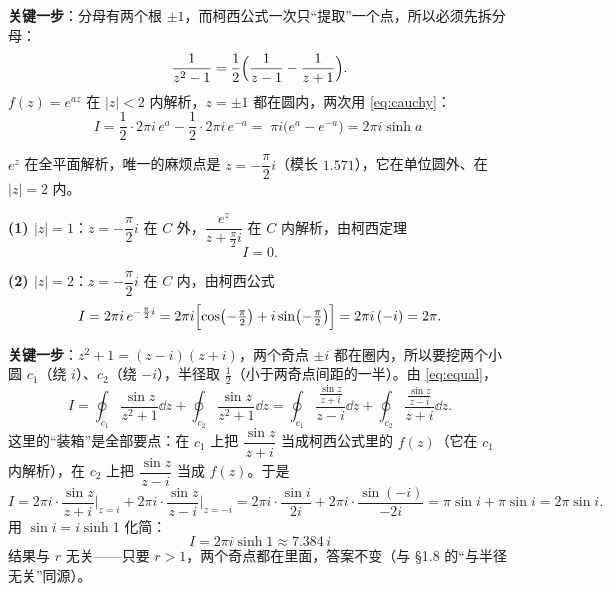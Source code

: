 \documentclass[11pt]{ctexart}
\renewcommand{\qbreak}{\needspace{0.45\textheight}}
\begin{document}
\textbf{关键一步}：分母有两个根 $\pm1$，而柯西公式一次只“提取”一个点，所以必须先拆分母：
\[ \frac{1}{z^{2}-1}=\frac12\Bigl(\frac{1}{z-1}-\frac{1}{z+1}\Bigr) . \]
$f(z)=e^{az}$ 在 $|z|<2$ 内解析，$z=\pm1$ 都在圆内，两次用 \eqref{eq:cauchy}：
\[ I=\frac12\cdot2\pi i\,e^{a}-\frac12\cdot2\pi i\,e^{-a}
=\boxed{\;\pi i\bigl(e^{a}-e^{-a}\bigr)=2\pi i\sinh a\;} \]


\qbreak
{}

$e^{z}$ 在全平面解析，唯一的麻烦点是 $z=-\dfrac{\pi}{2}i$（模长 $1.571$），它在单位圆外、在 $|z|=2$ 内。

\textbf{(1) $|z|=1$}：$z=-\dfrac{\pi}{2}i$ 在 $C$ 外，$\dfrac{e^{z}}{z+\frac{\pi}{2}i}$ 在 $C$ 内解析，由柯西定理
\[ I=0 . \]

\textbf{(2) $|z|=2$}：$z=-\dfrac{\pi}{2}i$ 在 $C$ 内，由柯西公式
\[ I=2\pi i\,e^{-\frac{\pi}{2}i}
=2\pi i\Bigl[\cos\bigl(-\tfrac{\pi}{2}\bigr)+i\sin\bigl(-\tfrac{\pi}{2}\bigr)\Bigr]
=2\pi i\,(-i)=2\pi . \]


\qbreak
{}

\textbf{关键一步}：$z^{2}+1=(z-i)(z+i)$，两个奇点 $\pm i$ 都在圈内，所以要挖两个小圆 $c_1$（绕 $i$）、$c_2$（绕 $-i$），半径取 $\tfrac12$（小于两奇点间距的一半）。由 \eqref{eq:equal}，
\[ I=\oint_{c_1}\frac{\sin z}{z^{2}+1}\dd z+\oint_{c_2}\frac{\sin z}{z^{2}+1}\dd z
=\oint_{c_1}\frac{\frac{\sin z}{z+i}}{z-i}\dd z+\oint_{c_2}\frac{\frac{\sin z}{z-i}}{z+i}\dd z . \]
这里的“装箱”是全部要点：在 $c_1$ 上把 $\dfrac{\sin z}{z+i}$ 当成柯西公式里的 $f(z)$（它在 $c_1$ 内解析），在 $c_2$ 上把 $\dfrac{\sin z}{z-i}$ 当成 $f(z)$。于是
\[ I=2\pi i\cdot\frac{\sin z}{z+i}\Big|_{z=i}+2\pi i\cdot\frac{\sin z}{z-i}\Big|_{z=-i}
=2\pi i\cdot\frac{\sin i}{2i}+2\pi i\cdot\frac{\sin(-i)}{-2i}
=\pi\sin i+\pi\sin i=2\pi\sin i . \]
用 $\sin i=i\sinh1$ 化简：
\[ \boxed{\;I=2\pi i\sinh1\approx7.384\,i\;} \]
结果与 $r$ 无关——只要 $r>1$，两个奇点都在里面，答案不变（与 §1.8 的“与半径无关”同源）。
\end{document}
